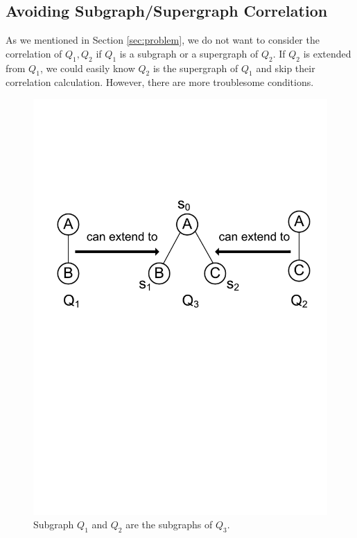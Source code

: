 \subsection{Avoiding Subgraph/Supergraph Correlation}\label{subsec:avoiding}
As we mentioned in Section \ref{sec:problem}, we do not want to consider the correlation of $Q_1,Q_2$ if $Q_1$ is a subgraph or a supergraph of $Q_2$. If $Q_2$ is extended from $Q_1$, we could easily know $Q_2$ is the supergraph of $Q_1$ and skip their correlation calculation. However, there are more troublesome conditions.


\begin{figure}[t!]
\centering
\includegraphics[scale=0.32]{images/avoiding}
\vspace{-2mm}
\caption{\scriptsize Subgraph $Q_1$ and $Q_2$ are the subgraphs of $Q_3$.}
\label{fig:avoiding}
\vspace{-6mm}
\end{figure}


